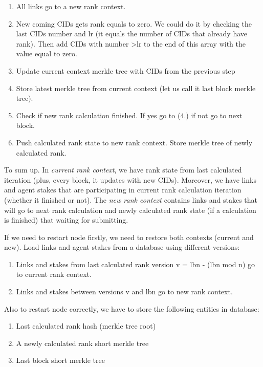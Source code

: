 \documentclass[8pt,oneside]{amsart}
\newcommand{\code}[1]{{\PlayBold #1}}
\begin{document}
\begin{enumerate}
  \item All links go to a new rank context.
  \item New coming CIDs gets rank equals to zero. We could do it by checking the last CIDs number and \code{lr} (it equals the number of CIDs that already have rank). Then add CIDs with number \code{>lr} to the end of this array with the value equal to zero.
  \item Update current context merkle tree with CIDs from the previous step
  \item Store latest merkle tree from current context (let us call it last block merkle tree).
  \item Check if new rank calculation finished. If yes go to (4.) if not go to next block.
  \item Push calculated rank state to new rank context. Store merkle tree of newly calculated rank.
\end{enumerate}
To sum up. In \textit{current rank context}, we have rank state from last calculated iteration (plus, every block, it updates with new CIDs). Moreover, we have links and agent stakes that are participating in current rank calculation iteration (whether it finished or not). The \textit{new rank context} contains links and stakes that will go to next rank calculation and newly calculated rank state (if a calculation is finished) that waiting for submitting.

If we need to restart node firstly, we need to restore both contexts (current and new).
Load links and agent stakes from a database using different versions:

\begin{enumerate}
  \item Links and stakes from last calculated rank version \code{v = lbn - (lbn mod n)} go to current rank context.
  \item Links and stakes between versions \code{v} and \code{lbn} go to new rank context.
\end{enumerate}

Also to restart node correctly, we have to store the following entities in database:

\begin{enumerate}
  \item Last calculated rank hash (merkle tree root)
  \item A newly calculated rank short merkle tree
  \item Last block short merkle tree
\end{enumerate}
\end{document}
